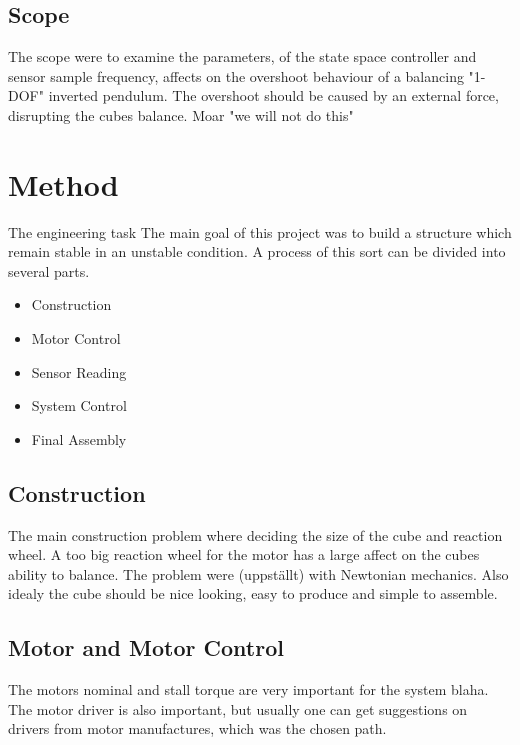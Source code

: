 \documentclass[a4paper,11pt]{kth-mag}
\begin{document}
\section{Scope}
The scope were to examine the parameters, of the state space controller and sensor sample frequency, affects on the overshoot behaviour of a balancing "1-DOF" inverted pendulum.
The overshoot should be caused by an external force, disrupting the cubes balance.
Moar "we will not do this"

\chapter{Method}

The engineering task The main goal of this project was to build a structure which remain stable in an unstable condition. A process of this sort can be divided into several parts. 
\begin{itemize}
\item Construction
\item Motor Control
\item Sensor Reading
\item System Control
\item Final Assembly
\end{itemize}

\section{Construction}
The main construction problem where deciding the size of the cube and reaction wheel. A too big reaction wheel for the motor has a large affect on the cubes ability to balance. The problem were (uppställt) with Newtonian mechanics.
Also idealy the cube should be nice looking, easy to produce and simple to assemble. 
 
\section{Motor and Motor Control}
The motors nominal and stall torque are very important for the system blaha. The motor driver is also important, but usually one can get suggestions on drivers from motor manufactures, which was the chosen path.
  
\end{document}
